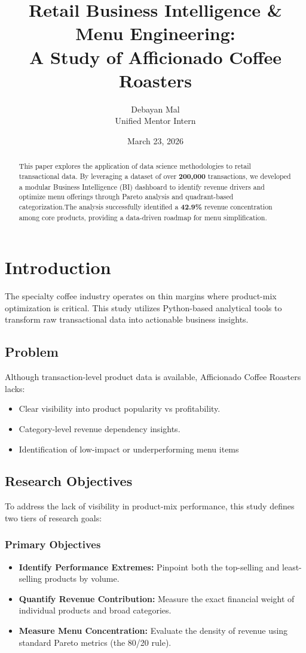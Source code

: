 \documentclass[12pt, a4paper]{article}
\title{\textbf\small{Retail Business Intelligence \& Menu Engineering: \\ A Study of Afficionado Coffee Roasters}}
\author{Debayan Mal \\ \small Unified Mentor Intern}
\date{March 23, 2026}
\begin{document}
	
	\maketitle
	
	\begin{abstract}
		This paper explores the application of data science methodologies to retail transactional data. By leveraging a dataset of over \textbf{200,000} transactions, we developed a modular Business Intelligence (BI) dashboard to identify revenue drivers and optimize menu offerings through Pareto analysis and quadrant-based categorization.The analysis successfully identified a \textbf{42.9\%} revenue concentration among core products, providing a data-driven roadmap for menu simplification.
	\end{abstract}
	
	\section{Introduction}
	The specialty coffee industry operates on thin margins where product-mix optimization is critical. This study utilizes Python-based analytical tools to transform raw transactional data into actionable business insights. 
    \subsection{Problem}
    Although transaction-level product data is available, Afficionado Coffee Roasters lacks:
	\begin{itemize}
		\item Clear visibility into product popularity vs profitability.
		\item Category-level revenue dependency insights.
		\item Identification of low-impact or underperforming menu items
	\end{itemize}
	\subsection{Research Objectives}
	To address the lack of visibility in product-mix performance, this study defines two tiers of research goals:
	
	\subsubsection{Primary Objectives}
	\begin{itemize}
		\item \textbf{Identify Performance Extremes:} Pinpoint both the top-selling and least-selling products by volume.
		\item \textbf{Quantify Revenue Contribution:} Measure the exact financial weight of individual products and broad categories.
		\item \textbf{Measure Menu Concentration:} Evaluate the density of revenue using standard Pareto metrics (the 80/20 rule).
	\end{itemize}
	
\end{document}
